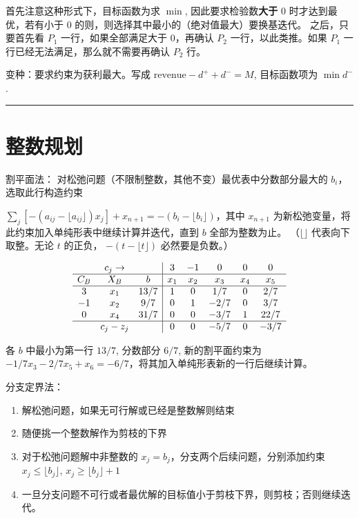 \documentclass[UTF8, 6pt]{ctexart}
\newcommand{\mcompress}{\vspace{-10 px}}
\newcommand{\sectionline}{\rule[2pt]{0.45\textwidth}{0.05em}}
\begin{document}
首先注意这种形式下，目标函数为求 $\min$, 因此要求检验数\textbf{大于} 0 时才达到最优，若有小于 0 的则，则选择其中最小的（绝对值最大）要换基迭代。
之后，只要首先看 $P_1$ 一行，如果全部满足大于 0，再确认 $P_2$ 一行，以此类推。如果 $P_1$ 一行已经无法满足，那么就不需要再确认 $P_2$ 行。

变种：要求约束为获利最大。写成 $\text{revenue} - d^+ + d^-  = M$, 目标函数项为 $\min d^-$.


\sectionline
\mcompress\mcompress
\section{整数规划}

割平面法：
对松弛问题（不限制整数，其他不变）最优表中分数部分最大的 $b_i$，选取此行构造约束

$\sum_j \left[-(a_{ij} - \lfloor a_{ij} \rfloor)x_j \right] + x_{n+1} = - (b_i - \lfloor b_i \rfloor) $，其中 $x_{n+1}$ 为新松弛变量，将此约束加入单纯形表中继续计算并迭代，直到 $b$ 全部为整数为止。
（$\lfloor \rfloor$ 代表向下取整。无论 $t$ 的正负， $- (t - \lfloor t \rfloor)$ 必然要是负数。）

\mcompress
\[
\begin{array}{ccc|ccccc}
	    & c_j \rightarrow &      &  3  & -1  &  0   &  0  &  0   \\ \hline
	C_B &       X_B       &  b   & x_1 & x_2 & x_3  & x_4 & x_5  \\ \hline
	 3  &       x_1       & 13/7 &  1  &  0  & 1/7  &  0  & 2/7  \\
	-1  &       x_2       & 9/7  &  0  &  1  & -2/7 &  0  & 3/7  \\
	 0  &       x_4       & 31/7 &  0  &  0  & -3/7 &  1  & 22/7 \\ \hline
	    &     c_j-z_j     &      &  0  &  0  & -5/7 &  0  & -3/7
\end{array}
\]
\mcompress


各 $b$ 中最小为第一行 $13/7$, 分数部分 $6/7$, 新的割平面约束为 $-1/7 x_3 - 2/7 x_5 + x_6 = -6/7$，将其加入单纯形表新的一行后继续计算。

分支定界法：

\begin{enumerate}
	\item 解松弛问题，如果无可行解或已经是整数解则结束
	\item 随便挑一个整数解作为剪枝的下界
	\item 对于松弛问题解中非整数的 $x_j = b_j$，分支两个后续问题，分别添加约束 $x_j \leq \lfloor b_j \rfloor$, $x_j \geq \lfloor b_j \rfloor +1$
	\item 一旦分支问题不可行或者最优解的目标值小于剪枝下界，则剪枝；否则继续迭代。
\end{enumerate}
\end{document}
